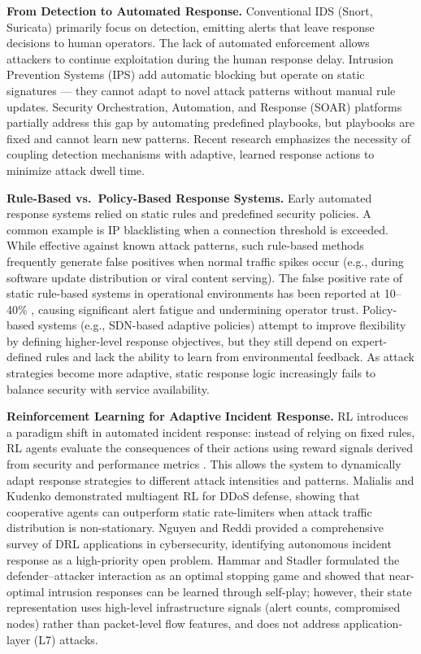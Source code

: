 \documentclass[12pt,a4paper]{report}
\begin{document}
\textbf{From Detection to Automated Response.} Conventional IDS (Snort, Suricata) primarily focus on detection, emitting alerts that leave response decisions to human operators. The lack of automated enforcement allows attackers to continue exploitation during the human response delay. Intrusion Prevention Systems (IPS) add automatic blocking but operate on static signatures --- they cannot adapt to novel attack patterns without manual rule updates. Security Orchestration, Automation, and Response (SOAR) platforms \cite{ibmSOAR2023} partially address this gap by automating predefined playbooks, but playbooks are fixed and cannot learn new patterns. Recent research emphasizes the necessity of coupling detection mechanisms with adaptive, learned response actions to minimize attack dwell time.

\textbf{Rule-Based vs.\ Policy-Based Response Systems.} Early automated response systems relied on static rules and predefined security policies. A common example is IP blacklisting when a connection threshold is exceeded. While effective against known attack patterns, such rule-based methods frequently generate false positives when normal traffic spikes occur (e.g., during software update distribution or viral content serving). The false positive rate of static rule-based systems in operational environments has been reported at 10--40\% \cite{alertFatigue2022}, causing significant alert fatigue and undermining operator trust. Policy-based systems (e.g., SDN-based adaptive policies) attempt to improve flexibility by defining higher-level response objectives, but they still depend on expert-defined rules and lack the ability to learn from environmental feedback. As attack strategies become more adaptive, static response logic increasingly fails to balance security with service availability.

\textbf{Reinforcement Learning for Adaptive Incident Response.} RL introduces a paradigm shift in automated incident response: instead of relying on fixed rules, RL agents evaluate the consequences of their actions using reward signals derived from security and performance metrics \cite{lopez2020application}. This allows the system to dynamically adapt response strategies to different attack intensities and patterns. Malialis and Kudenko \cite{malialis2015ddos} demonstrated multiagent RL for DDoS defense, showing that cooperative agents can outperform static rate-limiters when attack traffic distribution is non-stationary. Nguyen and Reddi \cite{nguyen2021deep} provided a comprehensive survey of DRL applications in cybersecurity, identifying autonomous incident response as a high-priority open problem. Hammar and Stadler \cite{hammar2024tnsm} formulated the defender--attacker interaction as an optimal stopping game and showed that near-optimal intrusion responses can be learned through self-play; however, their state representation uses high-level infrastructure signals (alert counts, compromised nodes) rather than packet-level flow features, and does not address application-layer (L7) attacks.
\end{document}

